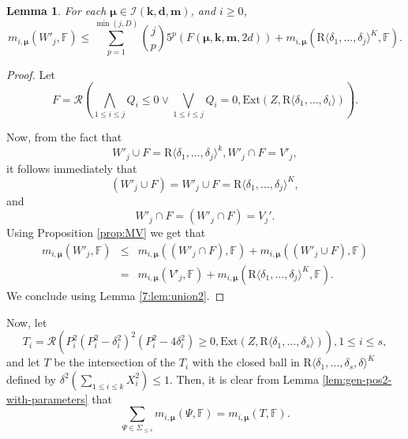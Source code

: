 \documentclass{amsart}
\newtheorem{lemma}{Lemma}
\theoremstyle{definition}
\theoremstyle{remark}
\numberwithin{equation}{section}
\begin{document}
\begin{lemma}
  \label{7:lem:union1}
  For each $\pmb{\mu}  \in 
\mathcal{I}({\mathbf{k}},{\mathbf{d}},{\mathbf{m}})$, and $i \geq 0$,
  \[ m_{i,\pmb{\mu}} (W'_{j},{\mathbb{F}}) \leq \sum_{p=1}^{\min (
     j,D)} \binom{j}{p} 5^{p}  (F (\pmb{\mu}, \mathbf{k},{\mathbf{m}},2 d)) +m_{i,\pmb{\mu}} ({\mathrm{R}} {{\langle}}
     \delta_{1} , \ldots , \delta_{j} {{\rangle}}^{K},{\mathbb{F}}) . \]
 \end{lemma}

\begin{proof} Let
\[ F= {{\mathcal R}} \left(\bigwedge_{1 \leq i \leq j} Q_{i} \leq 0 \vee \bigvee_{1 \leq
   i \leq j} Q_{i} =0, {\mathrm{Ext}} (Z, {\mathrm{R}} {{\langle}} \delta_{1} , \ldots , \delta_{i} \rangle)
   \right) . \]

Now, from the fact that \[ W'_{j} \cup F= {\mathrm{R}} {{\langle}} \delta_{1} , \ldots ,
   \delta_{j} {{\rangle}}^{k} ,W'_{j} \cap F=V'_{j},\] it follows
immediately that
\[ (W'_{j} \cup F)  =W'_{j}
    \cup F = {\mathrm{R}} {{\langle}}
   \delta_{1} , \ldots , \delta_{j} {{\rangle}}^{K}  , \]
and
\[ W'_{j}  \cap F = (W'_{j} \cap F)  =V_{j}'. 
   \]
Using Proposition \ref{prop:MV} we get that
\begin{eqnarray*}
  m_{i,\pmb{\mu}} (W'_{j} ,{\mathbb{F}}) & \leq & m_{i,\pmb{\mu}} ((
  W'_{j} \cap F),{\mathbb{F}}) +m_{i,\pmb{\mu}} ((W'_{j}
  \cup F),{\mathbb{F}})\\
  & = & m_{i,\pmb{\mu}} (V'_{j},{\mathbb{F}}) + m_{i,\pmb{\mu}} (
  {\mathrm{R}} {{\langle}} \delta_{1} , \ldots , \delta_{j} {{\rangle}}^{K},{\mathbb{F}}).
\end{eqnarray*}
We conclude using Lemma \ref{7:lem:union2}.
\end{proof}

Now, let
\[ T_{i} = {{\mathcal R}} \left(P_{i}^{2} (P_{i}^{2} - \delta_{i}^{2})^{2} (P_{i}^{2}
   -4 \delta_{i}^{2}) \geq 0, {\mathrm{Ext}} (Z, {\mathrm{R}} {{\langle}} \delta_{1} , \ldots ,
   \delta_{s} \rangle) \right), 1 \leq i \leq s, 
   \]
and let $T$ be the intersection of the $T_{i}$ with the closed ball in ${\mathrm{R}} {{\langle}}
\delta_{1} , \ldots , \delta_{s} , \delta {{\rangle}}^{K}$ defined by $\delta^{2}
\left(\sum_{1 \leq i \leq k} X_{i}^{2} \right) \leq 1$. Then, it is clear
from Lemma \ref{lem:gen-pos2-with-parameters} that
\begin{equation}
  \sum_{\Psi \in \Sigma_{\le s}} m_{i,\pmb{\mu}} (\Psi,{\mathbb{F}}) =
  m_{i,\pmb{\mu}} (T,{\mathbb{F}}) .
  \label{eqn:Psi-S}
\end{equation}
\end{document}
